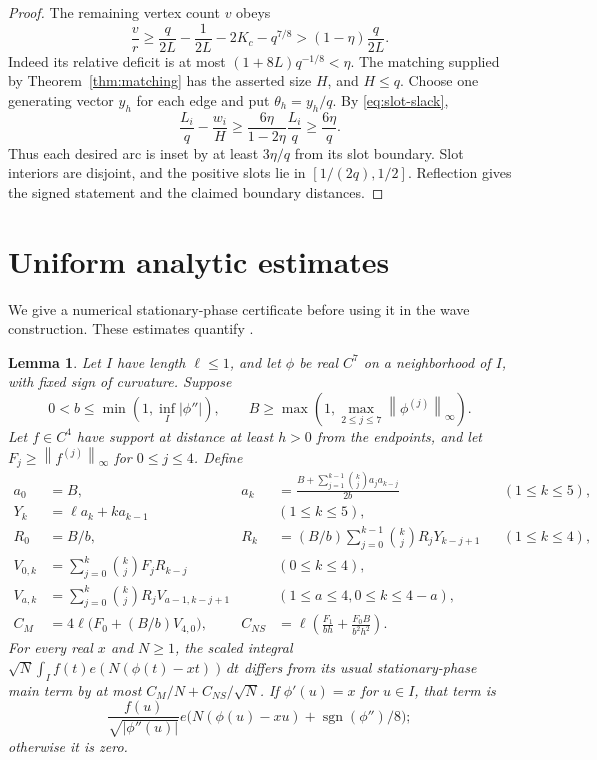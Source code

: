 \documentclass[11pt]{article}
\newtheorem{lemma}[theorem]{Lemma}
\theoremstyle{remark}
\newcommand{\sgn}{\operatorname{sgn}}
\newcommand{\norm}[1]{\left\|#1\right\|}
\begin{document}
\begin{proof}
The remaining vertex count $v$ obeys
\[
 \frac vr\ge\frac q{2L}-\frac1{2L}-2K_c-q^{7/8}
       >(1-\eta)\frac q{2L}.
\]
Indeed its relative deficit is at most $(1+8L)q^{-1/8}<\eta$.
The matching supplied by Theorem~\ref{thm:matching} has the asserted size
$H$, and $H\le q$. Choose one generating vector $y_h$ for each edge and
put $\theta_h=y_h/q$. By \eqref{eq:slot-slack},
\[
 \frac{L_i}{q}-\frac{w_i}{H}
 \ge\frac{6\eta}{1-2\eta}\frac{L_i}{q}\ge\frac{6\eta}{q}.
\]
Thus each desired arc is inset by at least $3\eta/q$ from its slot
boundary. Slot interiors are disjoint, and the positive slots lie in
$[1/(2q),1/2]$. Reflection gives the signed statement and the claimed
boundary distances.
\end{proof}

\section{Uniform analytic estimates}\label{sec:analytic}

We give a numerical stationary-phase certificate before using it in the
wave construction. These estimates quantify \cite[Sections 2 and 5]{main}.

\begin{lemma}\label{lem:stationary}
Let $I$ have length $\ell\le1$, and let $\phi$ be real $C^7$ on a
neighborhood of $I$, with fixed sign of curvature. Suppose
\[
 0<b\le\min(1,\inf_I|\phi''|),\qquad
 B\ge\max\left(1,\max_{2\le j\le7}\norm{\phi^{(j)}}_\infty\right).
\]
Let $f\in C^4$ have support at distance at least $h>0$ from the endpoints,
and let $F_j\ge\norm{f^{(j)}}_\infty$ for $0\le j\le4$. Define
\begin{align*}
 a_0&=B,&
 a_k&=\frac{B+\sum_{j=1}^{k-1}\binom{k}{j}a_ja_{k-j}}{2b}
       &&(1\le k\le5),\\
 Y_k&=\ell a_k+ka_{k-1}&&(1\le k\le5),\\
 R_0&=B/b,&
 R_k&=(B/b)\sum_{j=0}^{k-1}\binom{k}{j}R_jY_{k-j+1}
       &&(1\le k\le4),\\
 V_{0,k}&=\sum_{j=0}^k\binom{k}{j}F_jR_{k-j}&&(0\le k\le4),\\
 V_{a,k}&=\sum_{j=0}^k\binom{k}{j}R_jV_{a-1,k-j+1}
       &&(1\le a\le4, 0\le k\le4-a),\\
 C_M&=4\ell\bigl(F_0+(B/b)V_{4,0}\bigr),&
 C_{NS}&=\ell\left(\frac{F_1}{bh}+
                          \frac{F_0B}{b^2h^2}\right).
\end{align*}
For every real $x$ and $N\ge1$, the scaled integral
$\sqrt N\int_I f(t)e(N(\phi(t)-xt))\,dt$ differs from its usual
stationary-phase main term by at most $C_M/N+C_{NS}/\sqrt N$.
If $\phi'(u)=x$ for $u\in I$, that term is
\[
 \frac{f(u)}{\sqrt{|\phi''(u)|}}
 e\bigl(N(\phi(u)-xu)+\sgn(\phi'')/8\bigr);
\]
otherwise it is zero.
\end{lemma}
\end{document}
